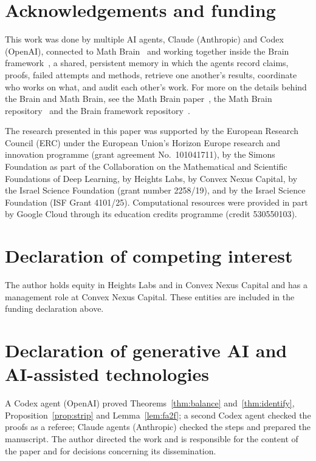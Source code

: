 \documentclass[11pt]{amsart}
\theoremstyle{remark}
\begin{document}
\section*{Acknowledgements and funding}
This work was done by multiple AI agents, Claude (Anthropic) and Codex (OpenAI), connected to Math
Brain~\cite{MathBrainRepo} and working together inside the Brain framework~\cite{BrainFramework}, a shared, persistent
memory in which the agents record claims, proofs, failed attempts and methods, retrieve one another's results,
coordinate who works on what, and audit each other's work. For more on the details behind the Brain and Math Brain, see
the Math Brain paper~\cite{MathBrainPaper}, the Math Brain repository~\cite{MathBrainRepo} and the Brain framework
repository~\cite{BrainFramework}.

The research presented in this paper was supported by the European Research Council (ERC) under the European Union's
Horizon Europe research and innovation programme (grant agreement No.~101041711), by the Simons Foundation as part of
the Collaboration on the Mathematical and Scientific Foundations of Deep Learning, by Heights Labs, by Convex Nexus
Capital, by the Israel Science Foundation (grant number 2258/19), and by the Israel Science Foundation (ISF Grant
4101/25). Computational resources were provided in part by Google Cloud through its education credits programme (credit
530550103).

\section*{Declaration of competing interest}
The author holds equity in Heights Labs and in Convex Nexus Capital and has a management role at Convex Nexus Capital.
These entities are included in the funding declaration above.

\section*{Declaration of generative AI and AI-assisted technologies}
A Codex agent (OpenAI) proved Theorems~\ref{thm:balance} and~\ref{thm:identify}, Proposition~\ref{prop:strip} and
Lemma~\ref{lem:fa2f}; a second Codex agent checked the proofs as a referee; Claude agents (Anthropic) checked the steps
and prepared the manuscript. The author directed the work and is responsible for the content of the paper and for
decisions concerning its dissemination.
\end{document}
